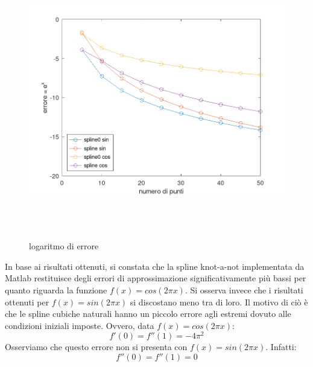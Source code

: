 \begin{figure}[!ht]
    \centering
    \includegraphics[width=16cm,height=12cm,keepaspectratio]{capitolo5/es22_figure.png}
    \caption{logaritmo di errore}
    \label{fig:es22}
\end{figure}
In base ai risultati ottenuti, si constata che la spline knot-a-not implementata da
Matlab restituisce degli errori di approssimazione significativamente più bassi
per quanto riguarda la funzione $f(x) = cos(2 \pi x)$. Si osserva invece che i risultati
ottenuti per $f(x) = sin(2 \pi x)$ si discostano meno tra di loro. Il motivo di ciò è
che le spline cubiche naturali hanno un piccolo errore agli estremi dovuto alle
condizioni iniziali imposte. Ovvero, data $f(x) = cos(2 \pi x)$:
\[
    f'(0) = f''(1) = -4 \pi ^2
\]
Osserviamo che questo errore non si presenta con $f(x) = sin(2 \pi x)$. Infatti:
\[
    f''(0) = f''(1) = 0
\]
